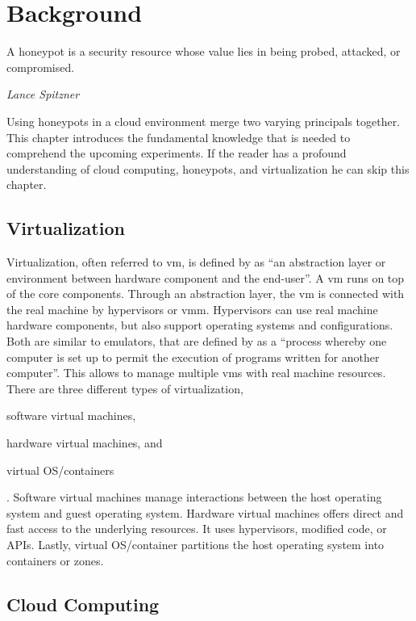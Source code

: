 \chapter{Background}
\label{chap:background}

\epigraph{A honeypot is a security resource whose value lies in being probed, attacked, or compromised.}{\textit{Lance Spitzner}}

Using honeypots in a cloud environment merge two varying principals together.
This chapter introduces the fundamental knowledge that is needed to comprehend the upcoming experiments.
If the reader has a profound understanding of cloud computing, honeypots, and virtualization he can skip this chapter.

\section{Virtualization}

Virtualization, often referred to \ac{vm}, is defined by \citet{kreuter2004} as \enquote{an abstraction layer or environment between hardware component and the end-user}.
A \ac{vm} runs on top of the  core components.
Through an abstraction layer, the \acl{vm} is connected with the real machine by hypervisors or \ac{vmm}.
Hypervisors can use real machine hardware components, but also support  operating systems and configurations.
Both are similar to emulators, that are defined by \citet{lichstei1969} as a \enquote{process whereby one computer is set up to permit the execution of programs written for another computer}.
This allows to manage multiple \acp{vm} with real machine resources.
There are three different types of virtualization,
\begin{enumerate*}[label=(\roman*)]
    \item software virtual machines,
    \item hardware virtual machines, and
    \item virtual OS/containers
\end{enumerate*}.
Software virtual machines manage interactions between the host operating system and guest operating system.
Hardware virtual machines offers direct and fast access to the underlying resources.
It uses hypervisors, modified code, or APIs.
Lastly, virtual OS/container partitions the host operating system into containers or zones.
\cite{daniels2009}

\section{Cloud Computing}
\label{sec:cloud-computing}

